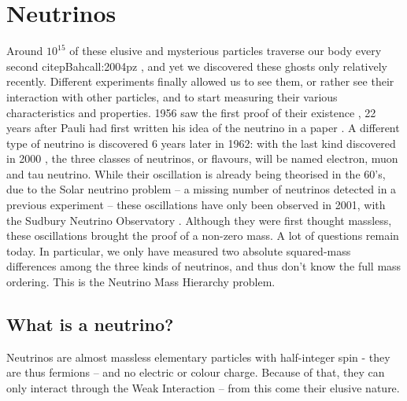 \section{Neutrinos}

Around $10^{15}$ of these elusive and mysterious particles traverse our body every second citep{Bahcall:2004pz}
, and yet we discovered these ghosts only relatively recently. Different experiments finally allowed us to see them, or rather see their interaction with other particles, and to start measuring their various characteristics and properties. 1956 saw the first proof of their existence \citep{Cowan:1992xc}, 22 years after Pauli had first written his idea of the neutrino in a paper \citep{Brown:1978pb}. A different type of neutrino is discovered 6 years later \citep{Danby:1962nd} in 1962: with the last kind discovered in 2000 \citep{Kodama:2000mp}, the three classes of neutrinos, or flavours, will  be named electron, muon and tau neutrino. While their oscillation is already being theorised in the 60's, due to the Solar neutrino problem -- a missing number of neutrinos detected in a previous experiment -- these oscillations have only been observed in 2001, with the Sudbury Neutrino Observatory \citep{Ahmad:2002jz}. Although they were first thought massless, these oscillations brought the proof of a non-zero mass. A lot of questions remain today. In particular, we only have measured two absolute squared-mass differences among the three kinds of neutrinos, and thus don't know the full mass ordering. This is the Neutrino Mass Hierarchy problem.

\subsection{What is a neutrino?}
Neutrinos are almost massless elementary particles with half-integer spin - they are thus fermions -- and no electric or colour charge. Because of that, they can only interact through the Weak Interaction -- from this come their elusive nature.


